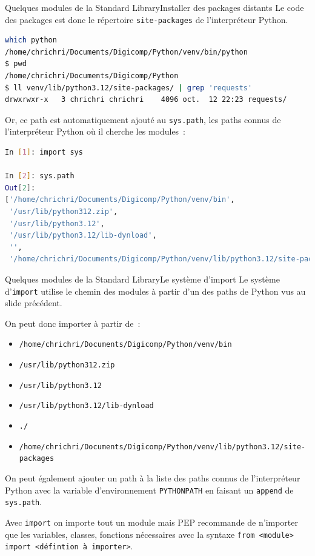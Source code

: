 \documentclass{beamer}
\begin{document}
    \begin{frame}[fragile]{Quelques modules de la Standard Library}{Installer des packages distants}
        Le code des packages est donc le répertoire \lstinline{site-packages} de l'interpréteur Python.
        \begin{lstlisting}[language=Bash]
which python
/home/chrichri/Documents/Digicomp/Python/venv/bin/python
$ pwd
/home/chrichri/Documents/Digicomp/Python
$ ll venv/lib/python3.12/site-packages/ | grep 'requests'
drwxrwxr-x   3 chrichri chrichri    4096 oct.  12 22:23 requests/
        \end{lstlisting}
        Or, ce path est automatiquement ajouté au \lstinline{sys.path}, les paths connus de l'interpréteur Python où il cherche les modules~:
        \begin{lstlisting}[language=Bash]
In [1]: import sys

In [2]: sys.path
Out[2]:
['/home/chrichri/Documents/Digicomp/Python/venv/bin',
 '/usr/lib/python312.zip',
 '/usr/lib/python3.12',
 '/usr/lib/python3.12/lib-dynload',
 '',
 '/home/chrichri/Documents/Digicomp/Python/venv/lib/python3.12/site-packages']
        \end{lstlisting}
    \end{frame}

    \begin{frame}{Quelques modules de la Standard Library}{Le système d'import}
        Le système d'\lstinline{import} utilise le chemin des modules à partir d'un des paths de Python vus au slide précédent.

        On peut donc importer à partir de~:
        \begin{itemize}
            \item \lstinline{/home/chrichri/Documents/Digicomp/Python/venv/bin}
            \item \lstinline{/usr/lib/python312.zip}
            \item \lstinline{/usr/lib/python3.12}
            \item \lstinline{/usr/lib/python3.12/lib-dynload}
            \item \lstinline{./}
            \item \lstinline{/home/chrichri/Documents/Digicomp/Python/venv/lib/python3.12/site-packages}
        \end{itemize}
        \bigbreak
        On peut également ajouter un path à la liste des paths connus de l'interpréteur Python avec la variable d'environnement \lstinline{PYTHONPATH} en faisant un \lstinline{append} de \lstinline{sys.path}.

        Avec \lstinline{import} on importe tout un module mais PEP recommande de n'importer que les variables, classes, fonctions nécessaires avec la syntaxe \lstinline{from <module> import <défintion à importer>}.
    \end{frame}
\end{document}
